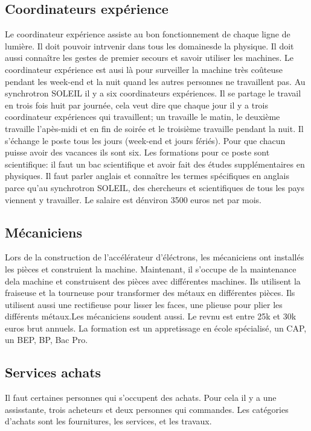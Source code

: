 		\subsection{Coordinateurs expérience}
			Le coordinateur expérience assiste au bon fonctionnement de chaque ligne de lumière. Il doit pouvoir intrvenir dans tous les domainesde la physique. Il doit aussi connaître les gestes de premier secours et savoir utiliser les machines.
			Le coordinateur expérience est ausi là pour surveiller la machine très coûteuse pendant les week-end et la nuit quand les autres personnes ne travaillent pas.
			Au synchrotron SOLEIL il y a six coordinateurs expériences. Il se partage le travail en trois fois huit par journée, 	cela veut dire que chaque jour il y a trois coordinateur expériences qui travaillent; un travaille le matin, le deuxième travaille l'apès-midi et en fin de soirée et le troisième travaille pendant la nuit. Il s'échange le poste tous les jours (week-end et jours fériés). Pour que chacun puisse avoir des vacances ils sont six.
			Les formations pour ce poste sont scientifique: il faut un bac scientifique et avoir fait des études supplémentaires en physiques. Il faut parler anglais et connaître les termes spécifiques en anglais parce qu'au synchrotron SOLEIL, des chercheurs et scientifiques de tous les pays viennent y travailler.
			Le salaire est dénviron 3500 euros net par mois.
		\subsection{Mécaniciens}
			Lors de la construction de l'accélérateur d'éléctrons, les mécaniciens ont installés les pièces et construient la machine. 
			Maintenant, il s'occupe de la maintenance dela machine et construisent des pièces avec différentes machines.
			Ils utilisent la fraiseuse et la tourneuse pour transformer des métaux en différentes pièces. Ils utilisent aussi une rectifieuse pour lisser les faces, une plieuse pour plier les différents métaux.Les mécaniciens soudent aussi.
			Le revnu est entre 25k et 30k euros brut annuels. La formation est un appretissage en école spécialisé, un CAP, un BEP, BP, Bac Pro.
		\subsection{Services achats}
			Il faut certaines personnes qui s'occupent des achats. Pour cela il y a une assisstante, trois acheteurs et deux personnes qui commandes. Les catégories d'achats sont les fournitures, les services, et les travaux.
